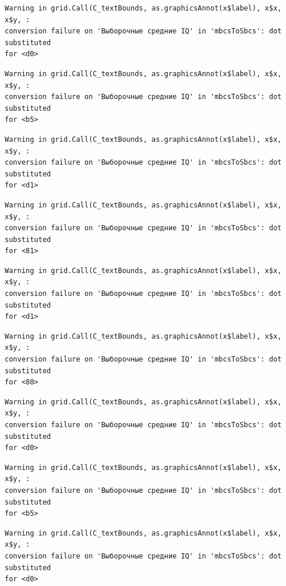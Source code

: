 \documentclass[
  letterpaper,
]{scrbook}
\theoremstyle{definition}
\theoremstyle{remark}
\begin{document}
\begin{verbatim}
Warning in grid.Call(C_textBounds, as.graphicsAnnot(x$label), x$x, x$y, :
conversion failure on 'Выборочные средние IQ' in 'mbcsToSbcs': dot substituted
for <d0>
\end{verbatim}

\begin{verbatim}
Warning in grid.Call(C_textBounds, as.graphicsAnnot(x$label), x$x, x$y, :
conversion failure on 'Выборочные средние IQ' in 'mbcsToSbcs': dot substituted
for <b5>
\end{verbatim}

\begin{verbatim}
Warning in grid.Call(C_textBounds, as.graphicsAnnot(x$label), x$x, x$y, :
conversion failure on 'Выборочные средние IQ' in 'mbcsToSbcs': dot substituted
for <d1>
\end{verbatim}

\begin{verbatim}
Warning in grid.Call(C_textBounds, as.graphicsAnnot(x$label), x$x, x$y, :
conversion failure on 'Выборочные средние IQ' in 'mbcsToSbcs': dot substituted
for <81>
\end{verbatim}

\begin{verbatim}
Warning in grid.Call(C_textBounds, as.graphicsAnnot(x$label), x$x, x$y, :
conversion failure on 'Выборочные средние IQ' in 'mbcsToSbcs': dot substituted
for <d1>
\end{verbatim}

\begin{verbatim}
Warning in grid.Call(C_textBounds, as.graphicsAnnot(x$label), x$x, x$y, :
conversion failure on 'Выборочные средние IQ' in 'mbcsToSbcs': dot substituted
for <80>
\end{verbatim}

\begin{verbatim}
Warning in grid.Call(C_textBounds, as.graphicsAnnot(x$label), x$x, x$y, :
conversion failure on 'Выборочные средние IQ' in 'mbcsToSbcs': dot substituted
for <d0>
\end{verbatim}

\begin{verbatim}
Warning in grid.Call(C_textBounds, as.graphicsAnnot(x$label), x$x, x$y, :
conversion failure on 'Выборочные средние IQ' in 'mbcsToSbcs': dot substituted
for <b5>
\end{verbatim}

\begin{verbatim}
Warning in grid.Call(C_textBounds, as.graphicsAnnot(x$label), x$x, x$y, :
conversion failure on 'Выборочные средние IQ' in 'mbcsToSbcs': dot substituted
for <d0>
\end{verbatim}
\end{document}
